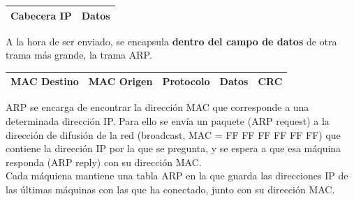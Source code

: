 \begin{table}[h] \centering \begin{tabular}{|c|c|}
\hline Cabecera IP & Datos \\ \hline \end{tabular}
\end{table}
A la hora de ser enviado, se encapsula \textbf{dentro del campo de datos} de otra trama más grande, la trama ARP.

\begin{table}[h] \centering \begin{tabular}{|l|c|c|l|l|}
\hline MAC Destino & MAC Origen & Protocolo & \textbf{Datos} & CRC \\ \hline \end{tabular}
\end{table}

ARP se encarga de encontrar la dirección MAC que corresponde a una determinada dirección IP. Para ello se envía un paquete (ARP request) a la dirección de difusión de la red (broadcast, MAC = FF FF FF FF FF FF) que contiene la dirección IP por la que se pregunta, y se espera a que esa máquina responda (ARP reply) con su dirección MAC.\\

Cada máquiena mantiene una tabla ARP en la que guarda las direcciones IP de las últimas máquinas con las que ha conectado, junto con su dirección MAC.

\newpage
